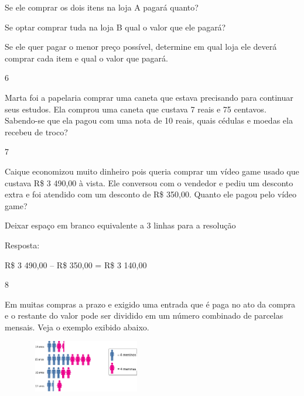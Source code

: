 \begin{escolha}

\item
  Se ele comprar os dois itens na loja A pagará quanto?

\item
  Se optar comprar tuda na loja B qual o valor que ele pagará?

\item
  Se ele quer pagar o menor preço possível, determine em qual loja ele
  deverá comprar cada item e qual o valor que pagará.
\end{escolha}

\num{6}

Marta foi a papelaria comprar uma caneta que estava precisando para
continuar seus estudos. Ela comprou uma caneta que custava 7 reais e 75
centavos. Sabendo-se que ela pagou com uma nota de 10 reais, quais
cédulas e moedas ela recebeu de troco?


\num{7}

Caique economizou muito dinheiro pois queria comprar um vídeo game usado
que custava R\$ 3 490,00 à vista. Ele conversou com o vendedor e pediu
um desconto extra e foi atendido com um desconto de R\$ 350,00. Quanto
ele pagou pelo vídeo game?

Deixar espaço em branco equivalente a 3 linhas para a resolução

Resposta:

R\$ 3 490,00 -- R\$ 350,00 = R\$ 3 140,00

\num{8}

Em muitas compras a prazo e exigido uma entrada que é paga no ato da
compra e o restante do valor pode ser dividido em um número combinado de
parcelas mensais. Veja o exemplo exibido abaixo.

\includegraphics[width=2.90025in,height=0.89174in]{media/image76.png}

